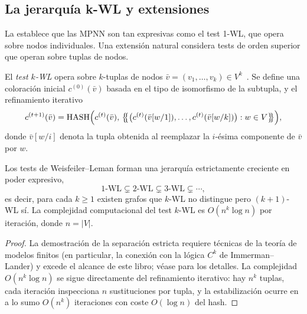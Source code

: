 \subsection{La jerarqu\'ia k-WL y extensiones}
\label{sec:priors:kwl}

La  establece que las MPNN son tan expresivas como el
test 1-WL, que opera sobre nodos individuales. Una extensi\'on natural considera
tests de orden superior que operan sobre tuplas de nodos.

\begin{definition}
\label{def:priors:kwl}
El \emph{test $k$-WL} opera sobre $k$-tuplas de nodos
$\bar v = (v_1, \dots, v_k) \in V^k$~\citep{morris2019weisfeiler}. Se define una
coloraci\'on inicial $c^{(0)}(\bar v)$ basada en el tipo de isomorfismo de la
subtupla, y el refinamiento iterativo
\[
  c^{(t+1)}(\bar v) = \operatorname{HASH}\Bigl(c^{(t)}(\bar v),\,
    \bigl\{\!\!\bigl\{ \bigl(c^{(t)}(\bar v[w/1]), \dots,
      c^{(t)}(\bar v[w/k])\bigr) : w \in V \bigr\}\!\!\bigr\}\Bigr),
\]
donde $\bar v[w/i]$ denota la tupla obtenida al reemplazar la $i$-\'esima
componente de $\bar v$ por $w$.
\end{definition}

\begin{proposition}
\label{prop:priors:kwl-hierarchy}
Los tests de Weisfeiler--Leman forman una jerarqu\'ia estrictamente creciente en
poder expresivo,
\[
  1\text{-WL} \subsetneq 2\text{-WL} \subsetneq 3\text{-WL} \subsetneq \cdots,
\]
es decir, para cada $k \ge 1$ existen grafos que $k$-WL no distingue pero
$(k+1)$-WL s\'i. La complejidad computacional del test $k$-WL es
$O(n^k \log n)$ por iteraci\'on, donde $n = |V|$.
\end{proposition}

\begin{proof}
La demostraci\'on de la separaci\'on estricta requiere t\'ecnicas de la teor\'ia
de modelos finitos (en particular, la conexi\'on con la l\'ogica $C^k$ de
Immerman--Lander) y excede el alcance de este libro; v\'ease
\citet{morris2019weisfeiler} para los detalles. La complejidad $O(n^k \log n)$ se
sigue directamente del refinamiento iterativo: hay $n^k$ tuplas, cada iteraci\'on
inspecciona $n$ sustituciones por tupla, y la estabilizaci\'on ocurre en a lo sumo
$O(n^k)$ iteraciones con coste $O(\log n)$ del hash. \qedhere
\end{proof}

